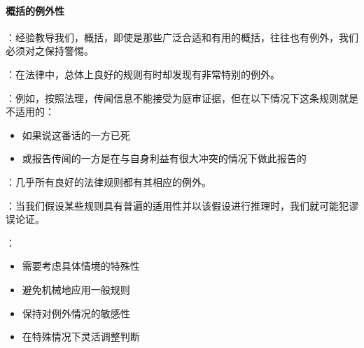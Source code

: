 \paragraph{概括的例外性}
\begin{examplebox}[title=概括的例外性]
：经验教导我们，概括，即使是那些广泛合适和有用的概括，往往也有例外，我们必须对之保持警惕。

：在法律中，总体上良好的规则有时却发现有非常特别的例外。

：例如，按照法理，传闻信息不能接受为庭审证据，但在以下情况下这条规则就是不适用的：
\begin{itemize}
  \item 如果说这番话的一方已死
  \item 或报告传闻的一方是在与自身利益有很大冲突的情况下做此报告的
\end{itemize}

：几乎所有良好的法律规则都有其相应的例外。

：当我们假设某些规则具有普遍的适用性并以该假设进行推理时，我们就可能犯谬误论证。

：
\begin{itemize}
  \item 需要考虑具体情境的特殊性
  \item 避免机械地应用一般规则
  \item 保持对例外情况的敏感性
  \item 在特殊情况下灵活调整判断
\end{itemize}
\end{examplebox}

